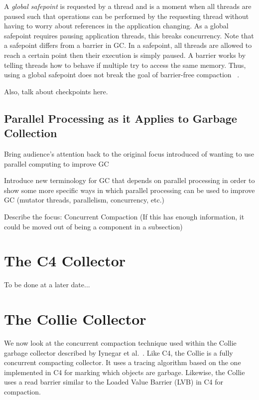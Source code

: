 \documentclass{sig-alternate}
\begin{document}
A \emph{global safepoint} is requested by a thread and is a moment when all 
threads are paused such that operations can be performed by the requesting thread without having to worry 
about references in the application changing. As a global safepoint requires pausing application
threads, this breaks concurrency.
Note that a safepoint differs from a barrier in GC. In a safepoint,
all threads are allowed to reach a certain point then their execution is simply paused.
A barrier works by telling threads how to behave if multiple try to access the same
memory. Thus, using a global safepoint does not break the goal of barrier-free compaction
~\cite{Humble:2015}.

Also, talk about checkpoints here.

\subsection{Parallel Processing as it Applies to Garbage Collection}
\label{sec:parallelProcessingGarbageCollection}

Bring audience's attention back to the original focus introduced 
of wanting to use parallel computing to improve GC

Introduce new terminology for GC that depends on parallel processing 
in order to show some more specific ways in which parallel processing 
can be used to improve GC (mutator threads, parallelism, concurrency, etc.)

Describe the focus: Concurrent Compaction (If this has enough information, 
it could be moved out of being a component in a subsection)


\section{The C4 Collector}
\label{sec:c4}

To be done at a later date...


\section{The Collie Collector}
\label{sec:collie}

We now look at the concurrent compaction technique used within the 
Collie garbage collector described by Iynegar et al.~\cite{Iyengar:Collie}. 
Like C4, the Collie is a fully concurrent compacting collector. It 
uses a tracing algorithm based on the one implemented in C4 for 
marking which objects are garbage. Likewise, the Collie uses a read
barrier similar to the Loaded Value Barrier (LVB) in C4 for 
compaction.
\end{document}
